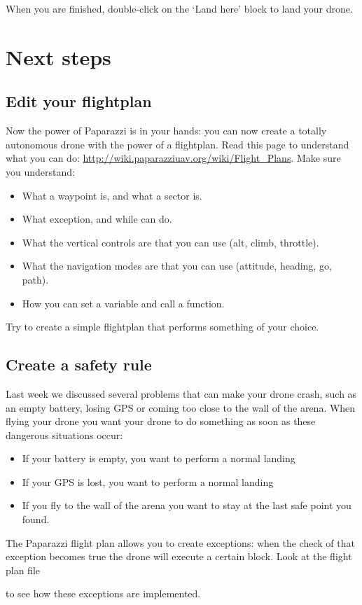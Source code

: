 \documentclass{article}
\begin{document}
When you are finished, double-click on the `Land here' block to land your drone.



\section{Next steps}
\subsection*{Edit your flightplan}
Now the power of Paparazzi is in your hands: you can now create a totally autonomous drone with the power of a flightplan. Read this page to understand what you can do: \url{http://wiki.paparazziuav.org/wiki/Flight_Plans}. 
Make sure you understand:
\begin{itemize}
	\item What a waypoint is, and what a sector is. 
	\item What exception, and while can do. 
	\item What the vertical controls are that you can use (alt, climb, throttle).
	\item What the navigation modes are that you can use (attitude, heading, go, path). 
	\item How you can set a variable and call a function. 
\end{itemize}

Try to create a simple flightplan that performs something of your choice. 

\subsection*{Create a safety rule}
Last week we discussed several problems that can make your drone crash, such as an empty battery, losing GPS or coming too close to the wall of the arena.
When flying your drone you want your drone to do something as soon as these dangerous situations occur:
\begin{itemize}
\item If your battery is empty, you want to perform a normal landing
\item If your GPS is lost, you want to perform a normal landing
\item If you fly to the wall of the arena you want to stay at the last safe point you found. 
\end{itemize}
The Paparazzi flight plan allows you to create exceptions: when the check of that exception becomes true the drone will execute a certain block. Look at the flight plan file 

 to see how these exceptions are implemented. 
\end{document}
